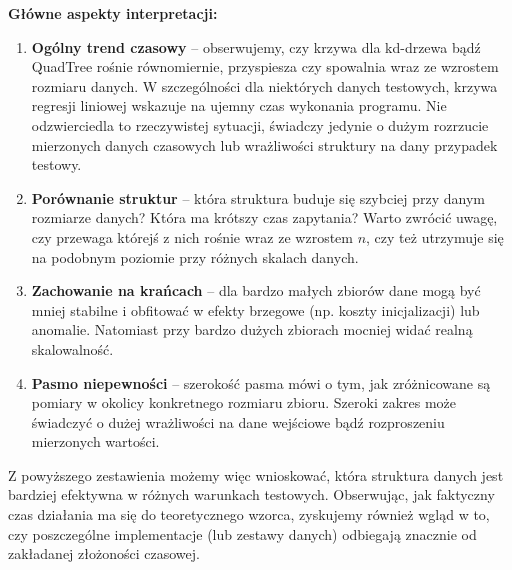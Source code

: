 \documentclass[12pt]{article}
\begin{document}
\noindent
\noindent
\textbf{Główne aspekty interpretacji:}
\begin{enumerate}
    \item \textbf{Ogólny trend czasowy} -- obserwujemy, czy krzywa dla kd-drzewa bądź QuadTree rośnie równomiernie, przyspiesza czy spowalnia wraz ze wzrostem rozmiaru danych. W szczególności dla niektórych danych testowych, krzywa regresji liniowej wskazuje na ujemny czas wykonania programu. Nie odzwierciedla to rzeczywistej sytuacji, świadczy jedynie o dużym rozrzucie mierzonych danych czasowych lub wrażliwości struktury na dany przypadek testowy.
    \item \textbf{Porównanie struktur} -- która struktura buduje się szybciej przy danym rozmiarze danych? Która ma krótszy czas zapytania? Warto zwrócić uwagę, czy przewaga którejś z nich rośnie wraz ze wzrostem $n$, czy też utrzymuje się na podobnym poziomie przy różnych skalach danych.
    \item \textbf{Zachowanie na krańcach} -- dla bardzo małych zbiorów dane mogą być mniej stabilne i obfitować w efekty brzegowe (np. koszty inicjalizacji) lub anomalie. Natomiast przy bardzo dużych zbiorach mocniej widać realną skalowalność.
    \item \textbf{Pasmo niepewności} -- szerokość pasma mówi o tym, jak zróżnicowane są pomiary w okolicy konkretnego rozmiaru zbioru. Szeroki zakres może świadczyć o dużej wrażliwości na dane wejściowe bądź rozproszeniu mierzonych wartości.
\end{enumerate}

\noindent
Z powyższego zestawienia możemy więc wnioskować, która struktura danych jest bardziej efektywna w różnych warunkach testowych. Obserwując, jak faktyczny czas działania ma się do teoretycznego wzorca, zyskujemy również wgląd w to, czy poszczególne implementacje (lub zestawy danych) odbiegają znacznie od zakładanej złożoności czasowej.
\pagebreak
\end{document}
